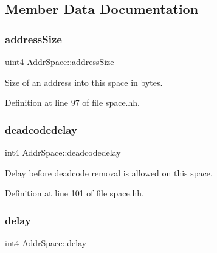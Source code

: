\subsection{Member Data Documentation}
\mbox{\label{class_addr_space_a05c9b715d49d562e566ca392818fb798}} 
\subsubsection{\texorpdfstring{addressSize}{addressSize}}
{\footnotesize\ttfamily uint4 Addr\+Space\+::address\+Size\hspace{0.3cm}{\ttfamily [protected]}}



Size of an address into this space in bytes. 



Definition at line 97 of file space.\+hh.

\mbox{\label{class_addr_space_aa2fd37355d0ed2ebee552ac944f67d95}} 
\subsubsection{\texorpdfstring{deadcodedelay}{deadcodedelay}}
{\footnotesize\ttfamily int4 Addr\+Space\+::deadcodedelay\hspace{0.3cm}{\ttfamily [protected]}}



Delay before deadcode removal is allowed on this space. 



Definition at line 101 of file space.\+hh.

\mbox{\label{class_addr_space_adb1ad3a09f9860eac23dd34f910808cd}} 
\subsubsection{\texorpdfstring{delay}{delay}}
{\footnotesize\ttfamily int4 Addr\+Space\+::delay\hspace{0.3cm}{\ttfamily [protected]}}



